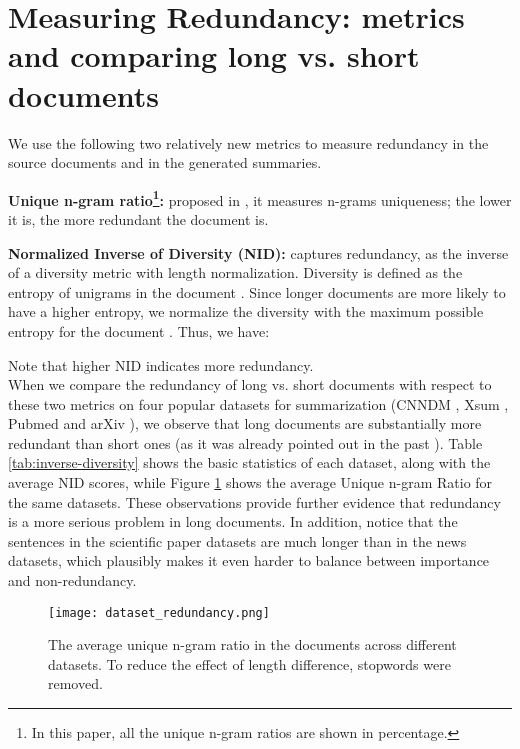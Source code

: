 \documentclass[11pt,a4paper]{article}
\begin{document}
\section{Measuring Redundancy: metrics and comparing long vs. short documents}
\label{sec-measure-red}
We use the following two relatively new metrics to measure redundancy in the source documents and in the generated summaries.

\textbf{Unique n-gram ratio\footnote{In this paper, all the unique n-gram ratios are shown in percentage.}:} proposed in , it measures n-grams uniqueness; the lower it is, the more redundant the document is.  

\textbf{Normalized Inverse of Diversity (NID):} captures redundancy, as the inverse of a diversity metric with length normalization. Diversity is defined as the entropy of unigrams in the document \cite{nid_score}.
Since longer documents are more likely to have a higher entropy, we normalize the diversity with the maximum possible entropy for the document . Thus, we have:

Note that higher NID indicates more redundancy. \\

When we compare the redundancy of long vs. short documents with respect to these two metrics  on four popular datasets for summarization (CNNDM \cite{nallapati-etal-2016-abstractive}, Xsum \cite{narayan-etal-2018-dont}, Pubmed and arXiv \cite{discourse-aware}), we observe that long documents are substantially more redundant than short ones (as it was already pointed out in the past \cite{longdoc_more_redundancy}).    Table \ref{tab:inverse-diversity} shows the basic statistics of each dataset, along with the average NID scores, while
Figure \ref{fig:n-gram} shows the average Unique n-gram Ratio for the same datasets. These observations provide further evidence that redundancy is a more serious problem in long documents. In addition, notice that the sentences in the scientific paper datasets are much longer than in the news datasets, which plausibly makes it even harder to balance between importance and non-redundancy.

\begin{figure}
    \centering
\texttt{[image: dataset\_redundancy.png]}
    \caption{The average unique n-gram ratio in the documents across different datasets. To reduce the effect of length difference, stopwords were removed.}
    \label{fig:n-gram}
    \vspace{-4mm}
\end{figure}
\end{document}

